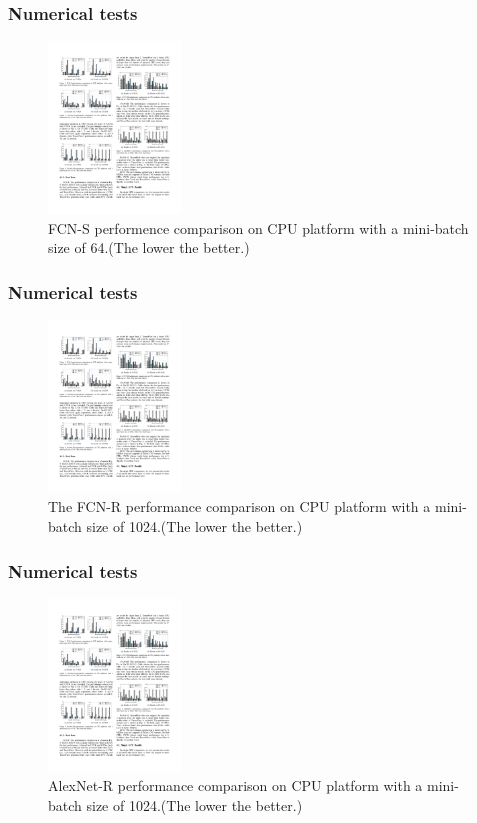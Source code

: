 %

\begin{frame}
	\MyLogo
	\frametitle{Numerical tests}  
	\begin{figure}[htbp] 
		\includegraphics[height=1.8in]{figures/FCN-S1.pdf} 
		\caption{FCN-S performence comparison on CPU platform with a mini-batch size of 64.(The lower the better.)}
	\end{figure}
\end{frame}
%

\begin{frame}
	\MyLogo
	\frametitle{Numerical tests}  
	\begin{figure}[htbp] 
		\includegraphics[height=1.8in]{figures/FCN-R1.pdf} 
		\caption{The FCN-R performance comparison on CPU platform with a mini-batch size of 1024.(The lower the better.)}
	\end{figure}
\end{frame}
%

\begin{frame}
	\MyLogo
	\frametitle{Numerical tests}  
	\begin{figure}[htbp] 
		\includegraphics[height=1.8in]{figures/AlexNet-R1.pdf} 
		\caption{AlexNet-R performance comparison on CPU platform with a mini-batch size of 1024.(The lower the better.)}
	\end{figure}
\end{frame}
%

